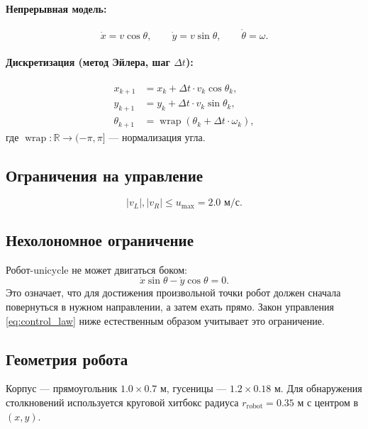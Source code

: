 \documentclass[12pt, a4paper]{article}
\newcommand{\R}{\mathbb{R}}
\newcommand{\wrap}{\operatorname{wrap}}
\theoremstyle{definition}
\theoremstyle{plain}
\begin{document}
\paragraph{Непрерывная модель:}
\begin{equation}\label{eq:continuous}
  \dot{x} = v\cos\theta, \qquad
  \dot{y} = v\sin\theta, \qquad
  \dot{\theta} = \omega.
\end{equation}

\paragraph{Дискретизация (метод Эйлера, шаг $\Delta t$):}
\begin{align}\label{eq:euler}
  x_{k+1} &= x_k + \Delta t \cdot v_k \cos\theta_k, \nonumber\\
  y_{k+1} &= y_k + \Delta t \cdot v_k \sin\theta_k, \\
  \theta_{k+1} &= \wrap(\theta_k + \Delta t \cdot \omega_k), \nonumber
\end{align}
где $\wrap: \R \to (-\pi, \pi]$ --- нормализация угла.

\subsection{Ограничения на управление}
\begin{equation}\label{eq:saturation}
  |v_L|, |v_R| \le u_{\max} = 2.0 \text{ м/с}.
\end{equation}

\subsection{Нехолономное ограничение}

Робот-unicycle не может двигаться боком:
\begin{equation}
  \dot{x}\sin\theta - \dot{y}\cos\theta = 0.
\end{equation}
Это означает, что для достижения произвольной точки робот должен сначала
повернуться в нужном направлении, а затем ехать прямо.  Закон управления
\eqref{eq:control_law} ниже естественным образом учитывает это ограничение.

\subsection{Геометрия робота}

Корпус --- прямоугольник $1.0 \times 0.7$ м, гусеницы --- $1.2 \times 0.18$ м.
Для обнаружения столкновений используется круговой хитбокс радиуса
$r_{\text{robot}} = 0.35$ м с центром в $(x, y)$.
\end{document}
